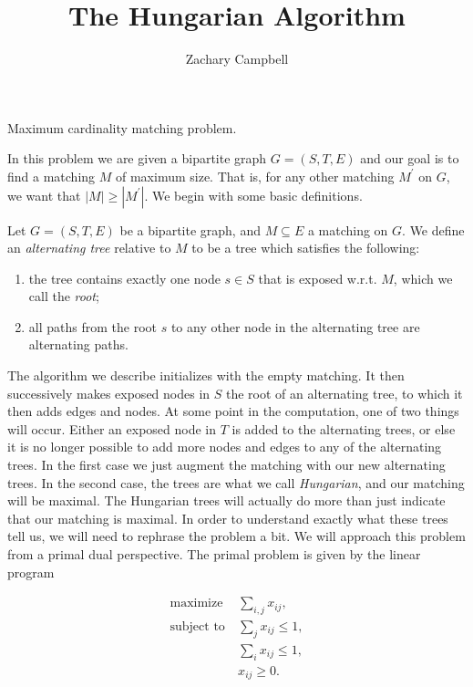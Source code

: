 \documentclass[11pt]{article}
\renewcommand{\'}{^{'}}
\newenvironment{definition}[2][Definition]{\begin{trivlist}
\item[\hskip \labelsep {\bfseries #1}\hskip \labelsep {\bfseries #2.}]}{\end{trivlist}}
\begin{document}
\title{The Hungarian Algorithm}
\author{Zachary Campbell}

\maketitle


\begin{section}{Maximum cardinality matching problem.}

In this problem we are given a bipartite graph $G = (S,T,E)$ and our goal is to 
find a matching $M$ of maximum size. That is, for any other matching $M^{'}$ on $G$, we 
want that $|M| \geq |M^{'}|$. We begin with some basic definitions.

\begin{definition}{}
	Let $G = (S,T,E)$ be a bipartite graph, and $M \subseteq E$ a matching on $G$. We define 
	an \emph{alternating tree} relative to $M$ to be a tree which satisfies the following:
	\begin{enumerate}
		\item the tree contains exactly one node $s\in S$ that is exposed w.r.t. $M$, which 
			we call the \emph{root};
		\item all paths from the root $s$ to any other node in the alternating tree 
			are alternating paths.
	\end{enumerate}
\end{definition}

The algorithm we describe initializes with the empty matching. It then successively makes exposed 
nodes in $S$ the root of an alternating tree, to which it then adds edges and nodes. At some point 
in the computation, one of two things will occur. Either an exposed node in $T$ is added to the 
alternating trees, or else it is no longer possible to add more nodes and edges to any of the 
alternating trees. In the first case we just augment the matching with our new alternating trees. In 
the second case, the trees are what we call \emph{Hungarian}, and our matching will be maximal. The 
Hungarian trees will actually do more than just indicate that our matching is maximal. In order to 
understand exactly what these trees tell us, we will need to rephrase the problem a bit. 
We will approach this problem from a primal dual perspective. The primal problem is 
given by the linear program 

\begin{align*}
	\text{maximize}\ &\sum_{i,j} x_{ij},\\
	\text{subject to}\ &\sum_j x_{ij} \leq 1,\\
	                   &\sum_i x_{ij} \leq 1,\\
			   &x_{ij} \geq 0.
\end{align*}


\end{section}
\end{document}
